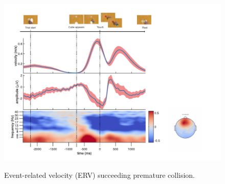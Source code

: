 
\begin{figure}[h]
  \includegraphics[width=\textwidth]{figures/pe_results_description.pdf}
  \label{res_desc}
  \caption{Event-related velocity (ERV) succeeding premature collision.}
\end{figure}